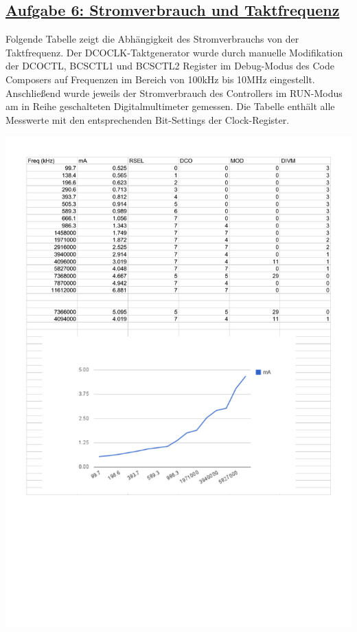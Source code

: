 \subsection*
{\href{http://cst.mi.fu-berlin.de/intern/19606-P-MPP/Aufgaben/040202.html}
{Aufgabe 6: Stromverbrauch und Taktfrequenz}}

Folgende Tabelle zeigt die Abhängigkeit des Stromverbrauchs von der Taktfrequenz. Der DCOCLK-Taktgenerator wurde durch manuelle Modifikation der DCOCTL, BCSCTL1 und BCSCTL2 Register im Debug-Modus des Code Composers auf Frequenzen im Bereich von 100kHz bis 10MHz eingestellt. Anschließend wurde jeweils der Stromverbrauch des Controllers im RUN-Modus am in Reihe geschalteten Digitalmultimeter gemessen. Die Tabelle enthält alle Messwerte mit den entsprechenden Bit-Settings der Clock-Register.

\includegraphics[width=\textwidth]{aufgaben/06/DCOCLK.pdf}
\\

